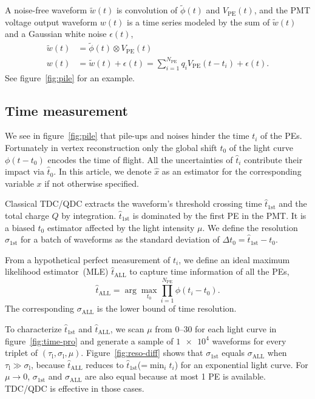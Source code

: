 A noise-free waveform $\tilde{w}(t)$ is convolution of $\tilde{\phi}(t)$ and $V_\mathrm{PE}(t)$, and the PMT voltage output waveform $w(t)$ is a time series modeled by the sum of $\tilde{w}(t)$ and a Gaussian white noise $\epsilon(t)$,
\begin{equation}
  \label{eq:1}
  \begin{aligned}
    \tilde{w}(t) &= \tilde{\phi}(t) \otimes V_\mathrm{PE}(t) \\
    w(t) &= \tilde{w}(t) + \epsilon(t) = \sum_{i=1}^{N_\mathrm{PE}} q_i V_\mathrm{PE}(t-t_i) + \epsilon(t).
  \end{aligned}
\end{equation}
See figure~\ref{fig:pile} for an example.


\subsection{Time measurement}
\label{sec:time}
We see in figure~\ref{fig:pile} that pile-ups and noises hinder the time $t_i$ of the PEs. Fortunately in vertex reconstruction only the global shift $t_0$ of the light curve $\phi(t-t_0)$ encodes the time of flight.  All the uncertainties of $\hat{t}_i$ contribute their impact via $\hat{t}_0$. In this article, we denote $\hat{x}$ as an estimator for the corresponding variable $x$ if not otherwise specified.

Classical TDC/QDC extracts the waveform's threshold crossing time $\hat{t}_\mathrm{1st}$ and the total charge $Q$ by integration.  $\hat{t}_\mathrm{1st}$ is dominated by the first PE in the PMT.  It is a biased $t_0$ estimator affected by the light intensity $\mu$. We define the resolution $\sigma_\mathrm{1st}$ for a batch of waveforms as the standard deviation of $\Delta t_0 = \hat{t}_\mathrm{1st} - t_0$.

From a hypothetical perfect measurement of $t_i$, we define an ideal maximum likelihood estimator~(MLE) $\hat{t}_\mathrm{ALL}$ to capture time information of all the PEs,
\begin{equation}
  \label{eq:2}
  \hat{t}_\mathrm{ALL} = \arg\underset{t_0}{\max} \prod_{i=1}^{N_\mathrm{PE}} \phi(t_i-t_0).
\end{equation}
The corresponding $\sigma_\mathrm{ALL}$ is the lower bound of time resolution. 

To characterize $\hat{t}_\mathrm{1st}$ and $\hat{t}_\mathrm{ALL}$, we scan $\mu$ from \numrange{0}{30} for each light curve in figure~\ref{fig:time-pro} and generate a sample of $\num[retain-unity-mantissa=false]{1e4}$ waveforms for every triplet of $(\tau_\mathrm{l}, \sigma_\mathrm{l}, \mu)$.  Figure~\ref{fig:reso-diff} shows that $\sigma_{\mathrm{1st}}$ equals $\sigma_{\mathrm{ALL}}$ when $\tau_\mathrm{l} \gg \sigma_\mathrm{l}$, because $\hat{t}_\mathrm{ALL}$ reduces to $\hat{t}_\mathrm{1st}$(=$\min_i t_i$) for an exponential light curve. For $\mu \to 0$, $\sigma_{\mathrm{1st}}$ and $\sigma_{\mathrm{ALL}}$ are also equal because at most 1 PE is available.  TDC/QDC is effective in those cases.

